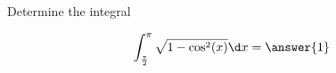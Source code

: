 \documentclass{ximera}
\author{Jason Miller}
\begin{document}
\begin{exercise}
Determine the integral

\[
\int_{\frac{\pi}{2}}^{\pi} \sqrt{1-\cos^{2}(x)} \d x=\answer{1}
\]


\end{exercise}
\end{document}
